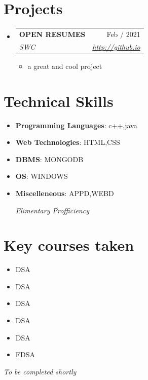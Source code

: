 \documentclass[a4paper,10pt]{report}
\makeatletter
\newcommand{\resumeItem}[2]{
  \item\small{
    \textbf{#1}{: #2 \vspace{-2pt}}
  }
}
\newcommand{\resumeSubheading}[4]{
  \vspace{-1pt}\item
    \begin{tabular*}{0.97\textwidth}[t]{l@{\extracolsep{\fill}}r}
      \textbf{#1} & #2 \\
      \textit{\small#3} & \textit{\small #4} \\
    \end{tabular*}\vspace{-6pt}
}
\newcommand{\resumeSubItem}[2]{\resumeItem{#1}{#2}\vspace{-4pt}}
\newcommand{\resumeSubHeadingListStart}{\begin{itemize}[leftmargin=*]}
\newcommand{\resumeSubHeadingListEnd}{\end{itemize}}
\makeatother
\begin{document}
\vspace{4pt}


\section{Projects}
\resumeSubHeadingListStart

\resumeSubheading{OPEN RESUMES}{Feb / 2021}{SWC}{\href{http://github.io}{\textit{\small http://github.io   }}}
\begin{itemize}
\item a great and cool  project
 \end{itemize}
\vspace{2pt}

  
\resumeSubHeadingListEnd


\vspace{4pt}


\section{Technical Skills}

 \resumeSubHeadingListStart
 
\resumeSubItem{Programming Languages}{c++,java}
\resumeSubItem{Web Technologies}{HTML,CSS}
\resumeSubItem{DBMS}{MONGODB}
\resumeSubItem{OS}{WINDOWS}
\resumeSubItem{Miscelleneous}{APPD,WEBD}
 
 \hfill * \textit{Elimentary Profficiency}
 
 \resumeSubHeadingListEnd
 
 
 \vspace{1pt}
 
 
 \section{Key courses taken}
\vspace{-2pt}
 \begin{multicols}{2}
 \begin{itemize}[leftmargin = *,itemsep=-3pt]

\item DSA
\item DSA
\item DSA
\item DSA
\item DSA
\item FDSA

 \end{itemize}
 \end{multicols}
 \hfill * \textit{To be completed shortly}
 
\end{document}

